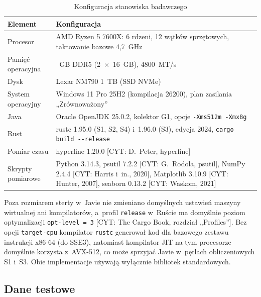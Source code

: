 \begin{table}[htbp]
  \centering
  \caption{Konfiguracja stanowiska badawczego}
  \label{tab:stanowisko}
  \begin{tabularx}{\textwidth}{|l|>{\raggedright\arraybackslash}X|}
    \hline
    Element & Konfiguracja \\
    \hline
    Procesor & AMD Ryzen 5 7600X: 6 rdzeni, 12 wątków sprzętowych, taktowanie bazowe 4,7~GHz \\
    \hline
    Pamięć operacyjna & 32~GB DDR5 (2~×~16~GB), 4800~MT/s \\
    \hline
    Dysk & Lexar NM790 1~TB (SSD NVMe) \\
    \hline
    System operacyjny & Windows 11 Pro 25H2 (kompilacja 26200), plan zasilania „Zrównoważony” \\
    \hline
    Java & Oracle OpenJDK 25.0.2, kolektor G1, opcje \texttt{-Xms512m -Xmx8g} \\
    \hline
    Rust & rustc 1.95.0 (S1, S2, S4) i~1.96.0 (S3), edycja 2024, \mbox{\texttt{cargo build -{}-release}} \\
    \hline
    Pomiar czasu & hyperfine 1.20.0 [CYT: D.~Peter, hyperfine] \\
    \hline
    Skrypty pomiarowe & Python 3.14.3, psutil 7.2.2 [CYT: G.~Rodola, psutil], NumPy 2.4.4 [CYT: Harris i~in., 2020], Matplotlib 3.10.9 [CYT: Hunter, 2007], seaborn 0.13.2 [CYT: Waskom, 2021] \\
    \hline
  \end{tabularx}
\end{table}

Poza rozmiarem sterty w~Javie nie zmieniano domyślnych ustawień maszyny wirtualnej ani kompilatorów, a~profil \texttt{release} w~Ruście ma domyślnie poziom optymalizacji \mbox{\texttt{opt-level = 3}} [CYT: The Cargo Book, rozdział „Profiles”].
Bez opcji \texttt{target-cpu} kompilator \texttt{rustc} generował kod dla bazowego zestawu instrukcji x86-64 (do SSE3), natomiast kompilator JIT na tym procesorze domyślnie korzysta z~AVX-512, co może sprzyjać Javie w~pętlach obliczeniowych S1 i~S3.
Obie implementacje używają wyłącznie bibliotek standardowych.

\subsection{Dane testowe}
\label{subsec:dane-testowe}


